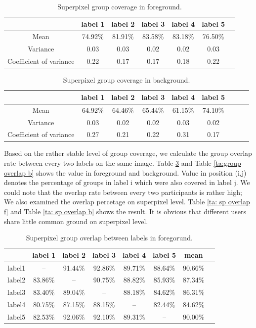 \documentclass[runningheads,a4paper]{llncs}
\begin{document}
\begin{table}[!tb]
\centering
\caption{Superpixel group coverage in foreground.}
\begin{tabular}{|c|c|c|c|c|c|c|}
\hline
 & label 1 & label 2&label 3&label 4&label 5\\
\hline
Mean& 74.92\% & 81.91\% & 83.58\%& 83.18\%& 76.50\%\\
\hline
Variance& 0.03 & 0.03& 0.02& 0.02& 0.03 \\
\hline
Coefficient of variance& 0.22 & 0.17 & 0.17& 0.18& 0.22 \\
\hline
\end{tabular}
\label{ta: label coverage f}
\end{table}

\begin{table}[!tb]
\centering
\caption{Superpixel group coverage in background.}
\begin{tabular}{|c|c|c|c|c|c|c|c|c|}
\hline
 & label 1 & label 2&label 3&label 4&label 5 \\
\hline
Mean& 64.92\% & 64.46\% & 65.44\%& 61.15\%& 74.10\% \\
\hline
Variance& 0.03 & 0.02 & 0.02& 0.03& 0.02 \\
\hline
Coefficient of variance& 0.27 & 0.21& 0.22& 0.31& 0.17 \\
\hline
\end{tabular}
\label{ta: label coverage b}
\end{table}


Based on the rather stable level of group coverage, we calculate the group overlap rate between every two labels on the same image. Table \ref{ta:group overlap f} and Table \ref{ta:group overlap b}  shows the value in foreground and background. Value in position (i,j) denotes the percentage of groups in label i which were also covered in label j. We could note that the overlap rate between every two participants is rather high; We also examined the overlap percetage on superpixel level. Table \ref{ta: sp overlap f} and Table \ref{ta: sp overlap b} shows the result. It is obvious that different users share little common ground on superpixel level.

\begin{table}[!tb]
\centering
\caption{Superpixel group overlap between labels in foregorund.}
\begin{tabular}{|c|c|c|c|c|c|c|c|}
\hline
 & label 1 & label 2&label 3&label 4&label 5&mean\\
\hline
label1& -- & 91.44\% & 92.86\%& 89.71\%& 88.64\%&90.66\%\\
\hline
label2& 83.86\% & -- & 90.75\%& 88.82\%& 85.93\%&87.34\%\\
\hline
label3& 83.40\% & 89.04\% & -- & 88.18\%& 84.62\%&86.31\% \\
\hline
label4& 80.75\% & 87.15\% & 88.15\%& -- & 82.44\%&84.62\% \\
\hline
label5& 82.53\% & 92.06\% & 92.10\%& 89.31\%& -- &90.00\% \\
\hline
\end{tabular}
\label{ta:group overlap f}
\end{table}
\end{document}

